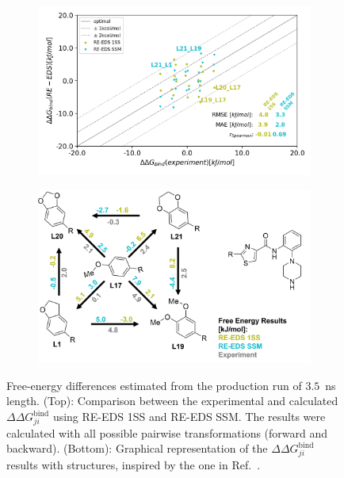 \begin{figure}[h]
    \centering
    \begin{subfigure}{0.85\columnwidth}
        \includegraphics[width=\textwidth]{fig/results/ringOpening/FE/RingClosure_system_final_results_4ns_comparison.png}
        \end{subfigure}
    \begin{subfigure}{0.85\columnwidth}
        \includegraphics[width=\textwidth]{fig/results/ringOpening/FE/ddG_bind_paper_comparison_reeds_only_4nsSimulation.png}
        \end{subfigure}
    \caption{Free-energy differences estimated from the production run of $3.5$~ns length. (Top): Comparison between the experimental and calculated $\Delta \Delta G^\text{bind}_{ji}$ using RE-EDS 1SS and RE-EDS SSM. The results were calculated with all possible pairwise transformations (forward and backward). (Bottom): Graphical representation of the $\Delta \Delta G^\text{bind}_{ji}$ results with structures, inspired by the one in Ref.~\cite{Wang2017}.}
    \label{fig:CHK1_set2_FreeEnergyCalculation}
\end{figure}

